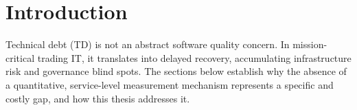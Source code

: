 \documentclass[
  12pt,
  letterpaper,
  12pt,
  oneside,
  english,
  onehalfspacing,
  headsepline]{MastersDoctoralThesis}
\begin{document}
\begin{acknowledgements}
\addchaptertocentry{\acknowledgementname} %
\noindent
\end{acknowledgements}


% 

\begingroup
\hypersetup{linkcolor=black}

\tableofcontents %

\listoffigures %

\listoftables %

\endgroup



\clearpage





\clearpage





\mainmatter %

\pagestyle{thesis} %
\newcommand{\keyword}[1]{\textbf{#1}}
\newcommand{\tabhead}[1]{\textbf{#1}}
\newcommand{\code}[1]{\texttt{#1}}
\newcommand{\file}[1]{\texttt{\bfseries#1}}
\newcommand{\option}[1]{\texttt{\itshape#1}}



\chapter{Introduction}\label{sec-chapter1}

Technical debt (TD) is not an abstract software quality concern. In
mission-critical trading IT, it translates into delayed recovery,
accumulating infrastructure risk and governance blind spots. The
sections below establish why the absence of a quantitative,
service-level measurement mechanism represents a specific and costly
gap, and how this thesis addresses it.
\end{document}
